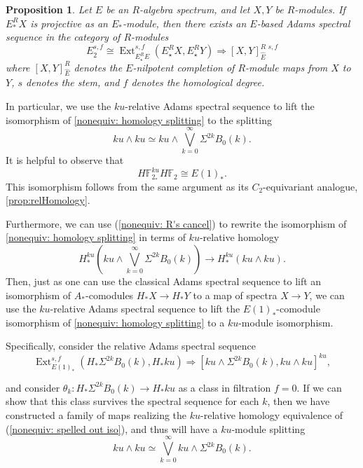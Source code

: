 \documentclass{amsart}
\newtheorem{proposition}[equation]{Proposition}
\theoremstyle{plain}
\numberwithin{equation}{section}
\numberwithin{figure}{section}
\DeclareMathOperator{\Ext}{Ext}
\newcommand{\mF}{{\mathbb F}}
\newcommand{\0}{\langle 0 \rangle }
\begin{document}
\begin{proposition}\cite[Prop~2.1]{baker2001adams}\label{nonequiv:relative ASS exists}
    Let $E$ be an $R$-algebra spectrum, and let $X,Y$ be $R$-modules. If $E_{*}^{R}X$ is projective as an $E_{*}$-module, then there exists an $E$-based Adams spectral sequence in the category of $R$-modules
\[
E_{2}^{s,f} \cong \Ext_{E_{\star}^{R} E}^{s,f} (E_\star^R X, E_\star^R Y) \Longrightarrow [X,Y]_{\widehat{E}}^{R \, \, s, f}
\]
 where $[X,Y]^{R}_{\widehat{E}}$ denotes the $E$-nilpotent completion of $R$-module maps from $X$ to $Y$, $s$ denotes the stem, and $f$ denotes the homological degree. 
\end{proposition}
In particular, we use the $ku$-relative Adams spectral sequence to lift the isomorphism of \cref{nonequiv: homology splitting} 
to the splitting 
\[ku \wedge ku \simeq ku \wedge \bigvee\limits_{k=0}^{\infty}\Sigma^{2k} B_{0}(k).\] 
It is helpful to observe that \begin{equation}\label{nonequiv:rel steenrod}H\mF_{2_{*}}^{ku}H\mF_{2} \cong E(1)_{*}.\end{equation}
This isomorphism follows from the same argument as its $C_2$-equivariant analogue, \cref{prop:relHomology}.

Furthermore, we can use (\ref{nonequiv: R's cancel}) to rewrite the isomorphism of \cref{nonequiv: homology splitting} in terms of $ku$-relative homology
\begin{equation}\label{nonequiv: spelled out iso} H_{*}^{ku}\left(ku \wedge \bigvee\limits_{k=0}^{\infty}\Sigma^{2k}B_{0}(k)\right)\to H_{*}^{ku}\left(ku \wedge ku \right) .\end{equation}
Then, just as one can use the classical Adams spectral sequence to lift an isomorphism of $A_{*}$-comodules $H_{*}X \to H_{*}Y$ to a map of spectra $X \to Y$, we can use the $ku$-relative Adams spectral sequence to lift the $E(1)_{*}$-comodule  isomorphism of \cref{nonequiv: homology splitting} to a $ku$-module isomorphism.

Specifically, consider the relative Adams spectral sequence 
\begin{equation}\label{nonequiv:ass}
     \Ext_{E(1)_{*}}^{s,f} \left(H_{*} \Sigma^{2k} B_{0}(k), H_{*}ku \right) \Longrightarrow [ku \wedge \Sigma^{2k}B_{0}(k), ku \wedge ku]^{ku},
\end{equation}

and consider $\theta_{k}: H_{*}\Sigma^{2k}B_{0}(k) \to H_{*}ku$ as a class in filtration $f=0$. If we can show that this class survives the spectral sequence for each $k$, then we have constructed a family of maps realizing the $ku$-relative homology equivalence of (\ref{nonequiv: spelled out iso}), and thus will have a $ku$-module splitting
\[ ku \wedge ku \simeq \bigvee\limits_{k=0}^{\infty}ku \wedge \Sigma^{2k}B_{0}(k) .\]
\end{document}
